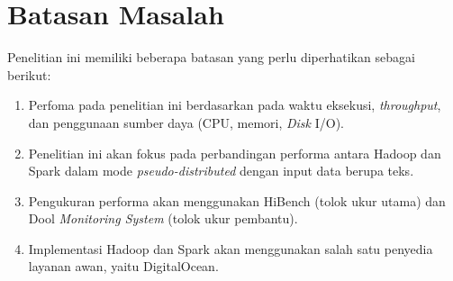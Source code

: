 \section{Batasan Masalah}
Penelitian ini memiliki beberapa batasan yang perlu diperhatikan sebagai berikut:
	\begin{enumerate}
		\item Perfoma pada penelitian ini berdasarkan pada waktu eksekusi, \textit{throughput}, dan penggunaan sumber daya (CPU, memori, \textit{Disk} I/O).
		\item Penelitian ini akan fokus pada perbandingan performa antara Hadoop dan Spark dalam mode \textit{pseudo-distributed} dengan input data berupa teks.
		\item Pengukuran performa akan menggunakan HiBench (tolok ukur utama) dan Dool \textit{Monitoring System} (tolok ukur pembantu). 
		\item Implementasi Hadoop dan Spark akan menggunakan salah satu penyedia layanan awan, yaitu DigitalOcean.
	\end{enumerate}

%
%
%
